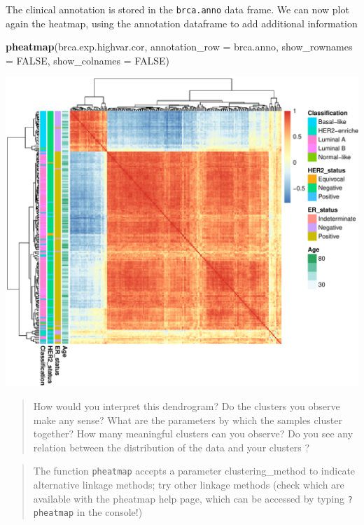 \documentclass[
]{book}
\newenvironment{Shaded}{\begin{snugshade}}{\end{snugshade}}
\newcommand{\AttributeTok}[1]{\textcolor[rgb]{0.13,0.29,0.53}{#1}}
\newcommand{\ConstantTok}[1]{\textcolor[rgb]{0.56,0.35,0.01}{#1}}
\newcommand{\FunctionTok}[1]{\textcolor[rgb]{0.13,0.29,0.53}{\textbf{#1}}}
\newcommand{\NormalTok}[1]{#1}
\begin{document}
The clinical annotation is stored in the \texttt{brca.anno} data frame.
We can now plot again the heatmap, using the annotation dataframe to add additional information

\begin{Shaded}
\begin{Highlighting}[]
\FunctionTok{pheatmap}\NormalTok{(brca.exp.highvar.cor,}
         \AttributeTok{annotation\_row =}\NormalTok{ brca.anno,}
         \AttributeTok{show\_rownames =} \ConstantTok{FALSE}\NormalTok{, }
         \AttributeTok{show\_colnames =} \ConstantTok{FALSE}\NormalTok{)}
\end{Highlighting}
\end{Shaded}

\includegraphics{_main_files/figure-latex/unnamed-chunk-80-1.pdf}

\begin{quote}
How would you interpret this dendrogram? Do the clusters you observe make any sense? What are the parameters by which the samples cluster together? How many meaningful clusters can you observe? Do you see any relation between the distribution of the data and your clusters ?
\end{quote}

\begin{quote}
The function \texttt{pheatmap} accepts a parameter clustering\_method to indicate alternative linkage methods; try other linkage methods (check which are available with the pheatmap help page, which can be accessed by typing \texttt{?pheatmap} in the console!)
\end{quote}
\end{document}
